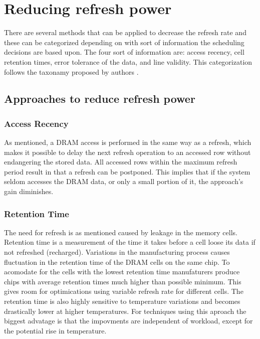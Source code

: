 \section{Reducing refresh power} 
\label{sec:red}
There are several methods that can be applied to decrease the refresh rate and these can be categorized depending on with sort of information the scheduling decisions are based upon. The four sort of information are: access recency, cell retention times, error tolerance of the data, and line validity. This categorization follows the taxonamy proposed by authors \cite{dtail}. 

\subsection{Approaches to reduce refresh power}

\subsubsection*{\textbf{Access Recency}}
As mentioned, a DRAM access is performed in the same way as a refresh, which makes it possible to delay the next refresh operation to an accessed row without endangering the stored data. All accessed rows within the maximum refresh period result in that a refresh can be postponed. This implies that if the system seldom accesses the DRAM data, or only a small portion of it, the approach's gain diminishes.


\subsubsection*{\textbf{Retention Time}}
The need for refresh is as mentioned caused by leakage in the memory cells. Retention time is a measurement of the time it takes before a cell loose its data if not refreshed (recharged). Variations in the manufacturing process causes fluctuation in the retention time of the DRAM cells on the same chip. To acomodate for the cells with the lowest retention time manufaturers produce chips with average retention times much higher than possible minimum. This gives room for optimications using variable refresh rate for different cells. The retention time is also highly sensitive to temperature variations and becomes drastically lower at higher temperatures. For techniques using this aproach the biggest advatage is that the impovments are independent of workload, except for the potential rise in temperature.   

